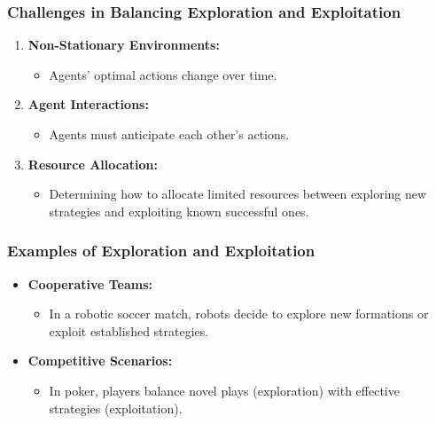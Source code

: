 \documentclass[aspectratio=169]{beamer}
\begin{document}
\begin{frame}[fragile]
    \frametitle{Challenges in Balancing Exploration and Exploitation}
    \begin{enumerate}
        \item \textbf{Non-Stationary Environments:} 
            \begin{itemize}
                \item Agents' optimal actions change over time.
            \end{itemize}
        \item \textbf{Agent Interactions:} 
            \begin{itemize}
                \item Agents must anticipate each other's actions.
            \end{itemize}
        \item \textbf{Resource Allocation:} 
            \begin{itemize}
                \item Determining how to allocate limited resources between exploring new strategies and exploiting known successful ones.
            \end{itemize}
    \end{enumerate}
\end{frame}

\begin{frame}[fragile]
    \frametitle{Examples of Exploration and Exploitation}
    \begin{itemize}
        \item \textbf{Cooperative Teams:} 
            \begin{itemize}
                \item In a robotic soccer match, robots decide to explore new formations or exploit established strategies.
            \end{itemize}
        \item \textbf{Competitive Scenarios:} 
            \begin{itemize}
                \item In poker, players balance novel plays (exploration) with effective strategies (exploitation).
            \end{itemize}
    \end{itemize}
\end{frame}
\end{document}
